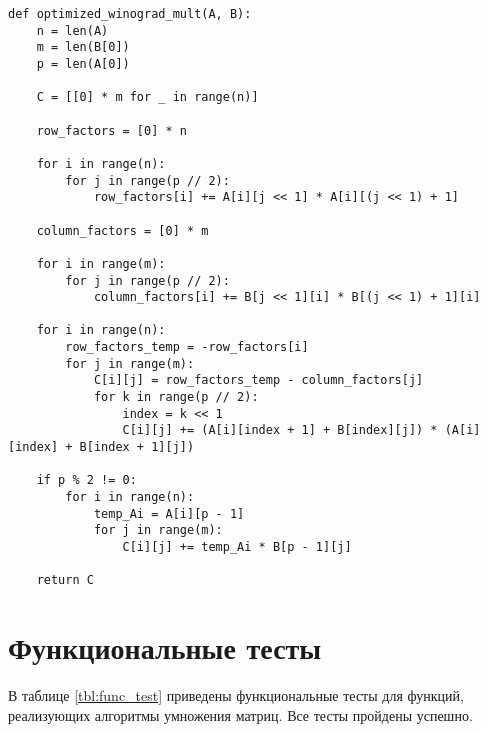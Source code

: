 \begin{center}
\captionsetup{justification=raggedright,singlelinecheck=off}
\begin{lstlisting}[label=lst:optimized,caption=Оптимизированный алгоритм Винограда умножения матриц]
def optimized_winograd_mult(A, B):
	n = len(A)
	m = len(B[0])
	p = len(A[0])
	
	C = [[0] * m for _ in range(n)]
	
	row_factors = [0] * n
	
	for i in range(n):
		for j in range(p // 2):
			row_factors[i] += A[i][j << 1] * A[i][(j << 1) + 1]
	
	column_factors = [0] * m
	
	for i in range(m):
		for j in range(p // 2):
			column_factors[i] += B[j << 1][i] * B[(j << 1) + 1][i]
	
	for i in range(n):
		row_factors_temp = -row_factors[i]
		for j in range(m):
			C[i][j] = row_factors_temp - column_factors[j]
			for k in range(p // 2):
				index = k << 1
				C[i][j] += (A[i][index + 1] + B[index][j]) * (A[i][index] + B[index + 1][j])
	
	if p % 2 != 0:
		for i in range(n):
			temp_Ai = A[i][p - 1]
			for j in range(m):
				C[i][j] += temp_Ai * B[p - 1][j]
	
	return C
\end{lstlisting}
\end{center}

\section{Функциональные тесты}

В таблице \ref{tbl:func_test} приведены функциональные тесты для функций, реализующих алгоритмы умножения матриц. Все тесты пройдены успешно.

